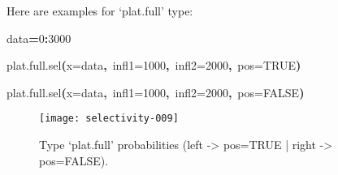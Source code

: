 \documentclass[letterpaper, 12pt]{article}
\newenvironment{Hinput}%
{}%
{}%
\newenvironment{Hchunk}%
{\vspace{0.5em}\par\begin{flushleft}}%
{\end{flushleft}}%
\newcommand{\hlnumber}[1]{\textcolor[rgb]{0.0823529411764706,0.0784313725490196,0.709803921568627}{#1}}%
\newcommand{\hlfunctioncall}[1]{\textcolor[rgb]{1,0,0}{#1}}%
\newcommand{\hlkeyword}[1]{\textcolor[rgb]{0,0,0}{\textbf{#1}}}%
\newcommand{\hlargument}[1]{\textcolor[rgb]{0.694117647058824,0.247058823529412,0.0196078431372549}{#1}}%
\newcommand{\hlassignement}[1]{\textcolor[rgb]{0.215686274509804,0.215686274509804,0.384313725490196}{\textbf{#1}}}%
\newcommand{\hlsymbol}[1]{\textcolor[rgb]{0,0,0}{#1}}%
\newcommand{\hlprompt}[1]{\textcolor[rgb]{0,0,0}{#1}}%
\begin{document}
Here are examples for `plat.full' type:
\begin{Hchunk}
\begin{normalsize}
\begin{Hinput}
\ttfamily\noindent
\hlprompt{\usebox{\hlnormalsizeboxgreaterthan}{\ }}\hlsymbol{data}\hlassignement{=}\hlnumber{0}\hlkeyword{:}\hlnumber{3000}\mbox{}
\normalfont
\end{Hinput}


\begin{Hinput}
\ttfamily\noindent
\hlprompt{\usebox{\hlnormalsizeboxgreaterthan}{\ }}\hlfunctioncall{plat.full.sel}\hlkeyword{(}\hlargument{x}\hlargument{=}\hlsymbol{data}\hlkeyword{,}{\ }\hlargument{infl1}\hlargument{=}\hlnumber{1000}\hlkeyword{,}{\ }\hlargument{infl2}\hlargument{=}\hlnumber{2000}\hlkeyword{,}{\ }\hlargument{pos}\hlargument{=}\hlnumber{TRUE}\hlkeyword{)}\mbox{}
\normalfont
\end{Hinput}


\begin{Hinput}
\ttfamily\noindent
\hlprompt{\usebox{\hlnormalsizeboxgreaterthan}{\ }}\hlfunctioncall{plat.full.sel}\hlkeyword{(}\hlargument{x}\hlargument{=}\hlsymbol{data}\hlkeyword{,}{\ }\hlargument{infl1}\hlargument{=}\hlnumber{1000}\hlkeyword{,}{\ }\hlargument{infl2}\hlargument{=}\hlnumber{2000}\hlkeyword{,}{\ }\hlargument{pos}\hlargument{=}\hlnumber{FALSE}\hlkeyword{)}\mbox{}
\normalfont
\end{Hinput}


\end{normalsize}
\end{Hchunk}

\begin{figure}[h]
\vspace{-20pt}
\begin{center}
\texttt{[image: selectivity-009]}
\end{center}
\vspace{-30pt}
\caption{Type `plat.full' probabilities (left -> pos=TRUE |  right -> pos=FALSE).}
\vspace{-10pt}
\label{fig4}
\end{figure}
\end{document}
